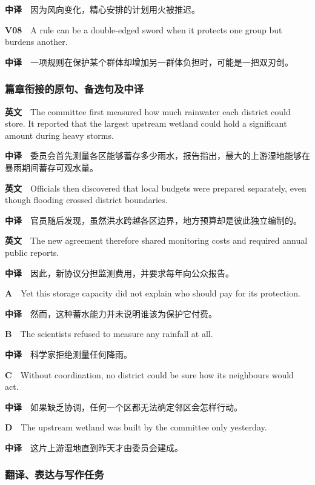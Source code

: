 \documentclass[
  11pt,
]{ctexart}
\begin{document}
\textbf{中译}　因为风向变化，精心安排的计划用火被推迟。

\textbf{V08}　A rule can be a double-edged sword when it protects one
group but burdens another.

\textbf{中译}　一项规则在保护某个群体却增加另一群体负担时，可能是一把双刃剑。

\subsubsection{篇章衔接的原句、备选句及中译}\label{ux7bc7ux7ae0ux8854ux63a5ux7684ux539fux53e5ux5907ux9009ux53e5ux53caux4e2dux8bd1}

\textbf{英文}　The committee first measured how much rainwater each
district could store. It reported that the largest upstream wetland
could hold a significant amount during heavy storms.

\textbf{中译}　委员会首先测量各区能够蓄存多少雨水，报告指出，最大的上游湿地能够在暴雨期间蓄存可观水量。

\textbf{英文}　Officials then discovered that local budgets were
prepared separately, even though flooding crossed district boundaries.

\textbf{中译}　官员随后发现，虽然洪水跨越各区边界，地方预算却是彼此独立编制的。

\textbf{英文}　The new agreement therefore shared monitoring costs and
required annual public reports.

\textbf{中译}　因此，新协议分担监测费用，并要求每年向公众报告。

\textbf{A}　Yet this storage capacity did not explain who should pay for
its protection.

\textbf{中译}　然而，这种蓄水能力并未说明谁该为保护它付费。

\textbf{B}　The scientists refused to measure any rainfall at all.

\textbf{中译}　科学家拒绝测量任何降雨。

\textbf{C}　Without coordination, no district could be sure how its
neighbours would act.

\textbf{中译}　如果缺乏协调，任何一个区都无法确定邻区会怎样行动。

\textbf{D}　The upstream wetland was built by the committee only
yesterday.

\textbf{中译}　这片上游湿地直到昨天才由委员会建成。

\subsubsection{翻译、表达与写作任务}\label{ux7ffbux8bd1ux8868ux8fbeux4e0eux5199ux4f5cux4efbux52a1}
\end{document}
